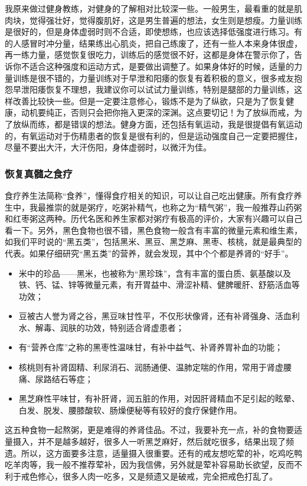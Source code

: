 我原来做过健身教练，对健身的了解相对比较深一些。一般男生，最看重的就是肌肉块，觉得强壮好，觉得腹肌好，这是男生普遍的想法，女生则是想瘦。力量训练是很好的，但是身体虚弱时则不合适，即使想练，也应该选择低强度进行练习。有的人感冒时冲分量，结果练出心肌炎，把自己练废了，还有一些人本来身体很虚，再一练力量，感觉恢复很吃力，训练后的感觉很不好，这都是身体在警示你了，告诉你不适合这种强度和运动方式，是要做出调整了。如果身体好的时候，适量的力量训练是很不错的，力量训练对于早泄和阳痿的恢复有着积极的意义，很多戒友抱怨早泄阳痿恢复不理想，我建议你可以试试力量训练，特别是腿部的力量训练，这样改善比较快一些。但是一定要注意修心，锻炼不是为了纵欲，只是为了恢复健康，动机要纯正，否则只会把你拖入更深的深渊。这点要切记！为了放纵而戒，为了放纵而练，都是错误的想法。健身方面，还包括有氧运动，我是很提倡有氧运动的，有氧运动对于伤精患者的恢复是很有利的，但是运动强度自己一定要把握住，尽量不要出大汗，大汗伤阳，身体虚弱时，以微汗为佳。

\subsubsection{恢复真髓之食疗}

食疗养生法简称“食养”，懂得食疗相关的知识，可以让自己吃出健康。所有食疗养生中，我最推崇的就是粥疗，吃粥补精气，也称之为“精气粥”，我一般推荐山药粥和红枣粥这两种。历代名医和养生家都对粥疗有极高的评价，大家有兴趣可以自己看一下。另外，黑色食物也很不错，黑色食物一般含有丰富的微量元素和维生素，如我们平时说的“黑五类”，包括黑米、黑豆、黑芝麻、黑枣、核桃，就是最典型的代表。如果仔细研究“黑五类”的营养，就会发现，其中个个都是养肾的“好手”。

\begin{itemize}
    \item 米中的珍品——黑米，也被称为“黑珍珠”，含有丰富的蛋白质、氨基酸以及铁、钙、锰、锌等微量元素，有开胃益中、滑涩补精、健脾暖肝、舒筋活血等功效；
    \item 豆被古人誉为肾之谷，黑豆味甘性平，不仅形状像肾，还有补肾强身、活血利水、解毒、润肤的功效，特别适合肾虚患者；
    \item 有“营养仓库”之称的黑枣性温味甘，有补中益气、补肾养胃补血的功能；
    \item 核桃则有补肾固精、利尿消石、润肠通便、温肺定喘的作用，常用于肾虚腰痛、尿路结石等症；
    \item 黑芝麻性平味甘，有补肝肾，润五脏的作用，对因肝肾精血不足引起的眩晕、白发、脱发、腰膝酸软、肠燥便秘等有较好的食疗保健作用。
\end{itemize}

这五种食物一起熬粥，更是难得的养肾佳品。不过，我要补充一点，补的食物要适量摄入，并不是越多越好，很多人一听黑芝麻好，然后就吃很多，结果出现了频遗。所以，这方面要多注意，适量摄入很重要。还有的戒友想吃荤的补，吃鸡吃鸭吃羊肉等，我一般不推荐荤补，因为我信佛，另外就是荤补容易助长欲望，反而不利于戒色修心，很多人肉一吃多，又是频遗又是破戒，完全把戒色打乱了。


